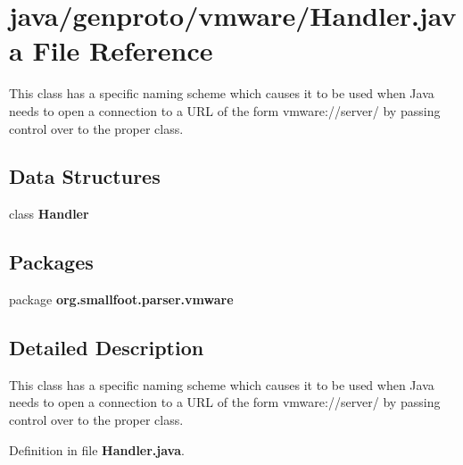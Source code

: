 \section{java/genproto/vmware/\+Handler.java File Reference}
\label{genproto_2vmware_2Handler_8java}


This class has a specific naming scheme which causes it to be used when Java needs to open a connection to a U\+R\+L of the form vmware\+://server/ by passing control over to the proper class.  


\subsection*{Data Structures}
\begin{DoxyCompactItemize}
\item 
class {\bf Handler}
\end{DoxyCompactItemize}
\subsection*{Packages}
\begin{DoxyCompactItemize}
\item 
package {\bf org.\+smallfoot.\+parser.\+vmware}
\end{DoxyCompactItemize}


\subsection{Detailed Description}
This class has a specific naming scheme which causes it to be used when Java needs to open a connection to a U\+R\+L of the form vmware\+://server/ by passing control over to the proper class. 



Definition in file {\bf Handler.\+java}.

